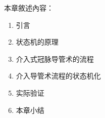 本章敘述內容：
\begin{enumerate}
  \item 引言
  \item 状态机的原理
  \item 介入式冠脉导管术的流程
  \item 介入导管术流程的状态机化
  \item 实际验证
  \item 本章小结
\end{enumerate} 